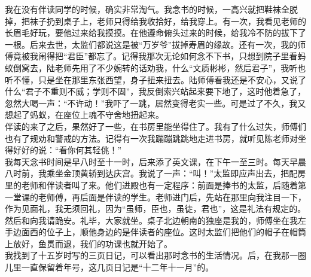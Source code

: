 我在没有伴读同学的时候，确实非常淘气。我念书的时候，一高兴就把鞋袜全脱掉，把袜子扔到桌子上，老师只得给我收拾好，给我穿上。有一次，我看见老师的长眉毛好玩，要他过来给我摸摸。在他遵命俯头过来的时候，给我冷不防的拔下了一根。后来去世，太监们都说这是被“万岁爷”拔掉寿眉的缘故。还有一次，我的师傅竟被我闹得把“君臣”都忘了。记得我那次无论如何念不下书，只想到院子里看蚂蚁倒窝去，陆老师先用了不少婉转的话劝我，什么“文质彬彬，然后君子”，我听也听不懂，只是坐在那里东张西望，身子扭来扭去。陆师傅看我还是不安心，又说了什么“君子不重则不威；学则不固”，我反倒索兴站起来要下地了，这时他着急了，忽然大喝一声：“不许动！”我吓了一跳，居然变得老实一些。可是过了不久，我又想起了蚂蚁，在座位上魂不守舍地扭起来。\\

伴读的来了之后，果然好了一些，在书房里能坐得住了。我有了什么过失，师傅们也有了规劝和警戒的方法。记得有一次我蹦蹦跳跳地走进书房，就听见陈老师对坐得好好的说：“看你何其轻佻！”\\

我每天念书时间是早八时至十一时，后来添了英文课，在下午一至三时。每天早晨八时前，我乘坐金顶黄轿到达庆宫。我说了一声：“叫！”太监即应声出去，把配房里的老师和伴读者叫了来。他们进殿也有一定程序：前面是捧书的太监，后随着第一堂课的老师傅，再后面是伴读的学生。老师进门后，先站在那里向我注目一下，作为见面礼，我无须回礼，因为“虽师，臣也，虽徒，君也”，这是礼法有规定的。然后和向我请跪安。礼毕，大家就坐。桌子北边朝南的独座是我的，师傅坐在我左手边面西的位子上，顺他身边的是伴读者的座位。这时太监们把他们的帽子在帽筒上放好，鱼贯而退，我们的功课也就开始了。\\

我找到了十五岁时写的三页日记，可以看出那时念书的生活情况。后，在我那一圈儿里一直保留着年号，这几页日记是“十二年十一月”的。\\


